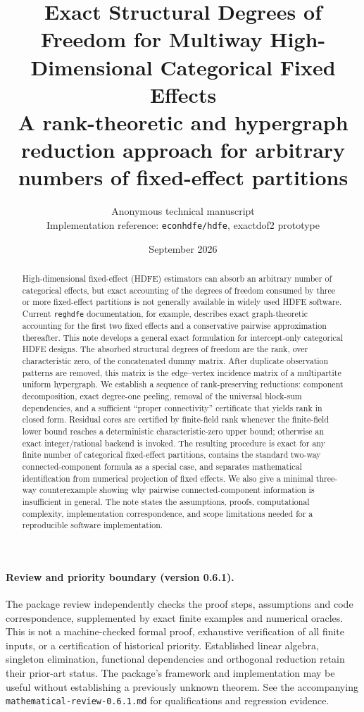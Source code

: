 \documentclass[11pt]{article}
\title{\textbf{Exact Structural Degrees of Freedom for Multiway High-Dimensional Categorical Fixed Effects}\\
\large A rank-theoretic and hypergraph reduction approach for arbitrary numbers of fixed-effect partitions}
\author{Anonymous technical manuscript\\[2pt]\small Implementation reference: \texttt{econhdfe/hdfe}, exactdof2 prototype}
\date{September 2026}
\theoremstyle{definition}
\newcommand{\1}{\mathbf{1}}
\begin{document}
\maketitle

\begin{abstract}
High-dimensional fixed-effect (HDFE) estimators can absorb an arbitrary number of categorical effects, but exact accounting of the degrees of freedom consumed by three or more fixed-effect partitions is not generally available in widely used HDFE software. Current \texttt{reghdfe} documentation, for example, describes exact graph-theoretic accounting for the first two fixed effects and a conservative pairwise approximation thereafter. This note develops a general exact formulation for intercept-only categorical HDFE designs. The absorbed structural degrees of freedom are the rank, over characteristic zero, of the concatenated dummy matrix. After duplicate observation patterns are removed, this matrix is the edge--vertex incidence matrix of a multipartite uniform hypergraph. We establish a sequence of rank-preserving reductions: component decomposition, exact degree-one peeling, removal of the universal block-sum dependencies, and a sufficient ``proper connectivity'' certificate that yields rank in closed form. Residual cores are certified by finite-field rank whenever the finite-field lower bound reaches a deterministic characteristic-zero upper bound; otherwise an exact integer/rational backend is invoked. The resulting procedure is exact for any finite number of categorical fixed-effect partitions, contains the standard two-way connected-component formula as a special case, and separates mathematical identification from numerical projection of fixed effects. We also give a minimal three-way counterexample showing why pairwise connected-component information is insufficient in general. The note states the assumptions, proofs, computational complexity, implementation correspondence, and scope limitations needed for a reproducible software implementation.
\end{abstract}

\paragraph{Review and priority boundary (version 0.6.1).}
The package review independently checks the proof steps, assumptions and code
correspondence, supplemented by exact finite examples and numerical oracles.
This is not a machine-checked formal proof, exhaustive verification of all finite
inputs, or a certification of historical priority. Established linear algebra,
singleton elimination, functional dependencies and orthogonal reduction retain
their prior-art status. The package's framework and implementation may be useful
without establishing a previously unknown theorem. See the accompanying
\texttt{mathematical-review-0.6.1.md} for qualifications and regression evidence.
\end{document}
